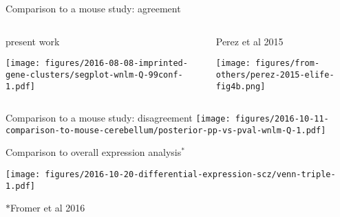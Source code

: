 \documentclass{beamer}
\newcommand{\ownfigscale}[0]{0.4}
\begin{document}
\begin{frame}[label=cf-mouse-agreement]{Comparison to a mouse study: agreement}
\begin{columns}[t]
\begin{column}{0.5\textwidth}
\begin{center}
present work

\texttt{[image: figures/2016-08-08-imprinted-gene-clusters/segplot-wnlm-Q-99conf-1.pdf]}

\end{center}
\end{column}

\begin{column}{0.5\textwidth}
\begin{center}
Perez et al 2015

\texttt{[image: figures/from-others/perez-2015-elife-fig4b.png]}
\end{center}
\end{column}
\end{columns}
\end{frame}

\begin{frame}[label=cf-mouse-disagreement]{Comparison to a mouse study: disagreement}
\texttt{[image: figures/2016-10-11-comparison-to-mouse-cerebellum/posterior-pp-vs-pval-wnlm-Q-1.pdf]}
\end{frame}

\begin{frame}[label=cf-overall-expression]{Comparison to overall expression analysis\(^\ast\)}
\begin{center}
\texttt{[image: figures/2016-10-20-differential-expression-scz/venn-triple-1.pdf]}

{\tiny\(\ast\)Fromer et al 2016}
\end{center}
\end{frame}
\end{document}
